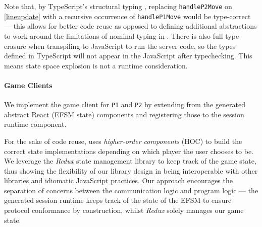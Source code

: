 Note that, by TypeScript's structural typing
\cite{TypeScriptSpec}, replacing
\texttt{handleP2Move} on \cref{lineupdate} with a recursive
occurrence of \texttt{handleP1Move} would be
type-correct --- this allows for better code reuse as opposed to
defining
additional abstractions to work around the limitations of nominal
typing in
\cite{Hybrid2016}.
There is also full type erasure when transpiling to JavaScript to
run the
server code, so the types defined in TypeScript will not appear in the
JavaScript after typechecking.
This means state space explosion is not a runtime consideration.

\paragraph{Game Clients}
We implement the game client for \texttt{P1} and
\texttt{P2} by extending from the generated abstract React (EFSM state)
components and registering those to the session runtime component.

For the sake of code reuse, \cite{NoughtsAndCrosses}
uses \textit{higher-order components} (HOC) to build the correct state
implementations depending on which player the user chooses to be.
We leverage the \textit{Redux} \cite{Redux} state management library to keep
track of the game state, thus showing the flexibility of our library design in
being interoperable with other libraries and idiomatic JavaScript practices.
Our approach encourages the separation of concerns between the
communication logic and program logic --- the generated session runtime
keeps track of the state of the EFSM to ensure protocol conformance by
construction, whilst \textit{Redux} solely manages our game state.
